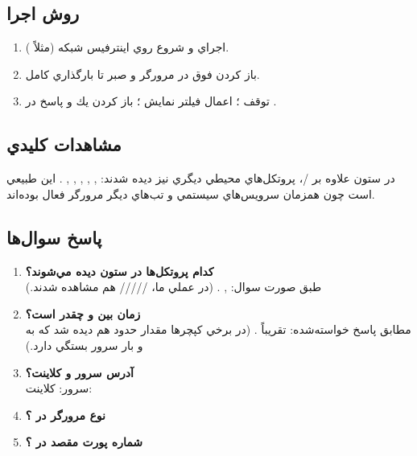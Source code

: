 \subsection{روش اجرا }
\begin{enumerate}[leftmargin=*,itemsep=2pt]
  \item اجراي  و شروع  روي اينترفيس شبكه (مثلاً ).
  \item باز كردن  فوق در مرورگر و صبر تا بارگذاري كامل.
  \item توقف ؛ اعمال فيلتر نمايش ؛ باز كردن يك  و پاسخ  در .
\end{enumerate}

\subsection{مشاهدات كليدي}
در ستون  علاوه بر /، پروتكل‌هاي محيطي ديگري نيز ديده شدند: , , , , , . اين طبيعي است چون همزمان سرويس‌هاي سيستمي و تب‌هاي ديگر مرورگر فعال بوده‌اند.

\subsection{پاسخ سوال‌ها}
\begin{enumerate}[leftmargin=*,itemsep=4pt]
  \item \textbf{كدام پروتكل‌ها در ستون  ديده مي‌شوند؟}\\
  طبق صورت سوال: , . (در  عملي ما، ///// هم مشاهده شدند.)
  \item \textbf{زمان بين  و  چقدر است؟}\\
  مطابق پاسخ خواسته‌شده: تقريباً . (در برخي كپچرها مقدار حدود  هم ديده شد كه به  و بار سرور بستگي دارد.)
  \item \textbf{آدرس  سرور و كلاينت؟}\\
  سرور: \quad كلاينت: 
  \item \textbf{نوع مرورگر در ؟}\\
  \item \textbf{شماره پورت مقصد در ؟}\\
\end{enumerate}

